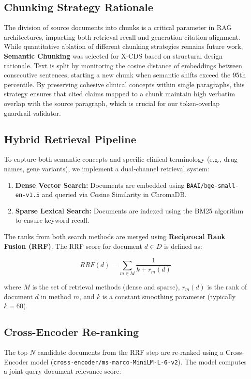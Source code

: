 \documentclass[sn-mathphys,Numbered]{sn-jnl}%
\begin{document}
\subsection{Chunking Strategy Rationale}
The division of source documents into chunks is a critical parameter in RAG architectures, impacting both retrieval recall and generation citation alignment. While quantitative ablation of different chunking strategies remains future work, \textbf{Semantic Chunking} was selected for X-CDS based on structural design rationale. Text is split by monitoring the cosine distance of embeddings between consecutive sentences, starting a new chunk when semantic shifts exceed the 95th percentile. By preserving cohesive clinical concepts within single paragraphs, this strategy ensures that cited claims mapped to a chunk maintain high verbatim overlap with the source paragraph, which is crucial for our token-overlap guardrail validator.

\subsection{Hybrid Retrieval Pipeline}
To capture both semantic concepts and specific clinical terminology (e.g., drug names, gene variants), we implement a dual-channel retrieval system:
\begin{enumerate}
    \item \textbf{Dense Vector Search:} Documents are embedded using \texttt{BAAI/bge-small-en-v1.5} and queried via Cosine Similarity in ChromaDB.
    \item \textbf{Sparse Lexical Search:} Documents are indexed using the BM25 algorithm to ensure keyword recall.
\end{enumerate}

The ranks from both search methods are merged using \textbf{Reciprocal Rank Fusion (RRF)}. The RRF score for document $d \in D$ is defined as:

\begin{equation}
RRF(d) = \sum_{m \in M} \frac{1}{k + r_m(d)}
\end{equation}

where $M$ is the set of retrieval methods (dense and sparse), $r_m(d)$ is the rank of document $d$ in method $m$, and $k$ is a constant smoothing parameter (typically $k=60$).

\subsection{Cross-Encoder Re-ranking}
The top $N$ candidate documents from the RRF step are re-ranked using a Cross-Encoder model (\texttt{cross-encoder/ms-marco-MiniLM-L-6-v2}). The model computes a joint query-document relevance score:
\end{document}
